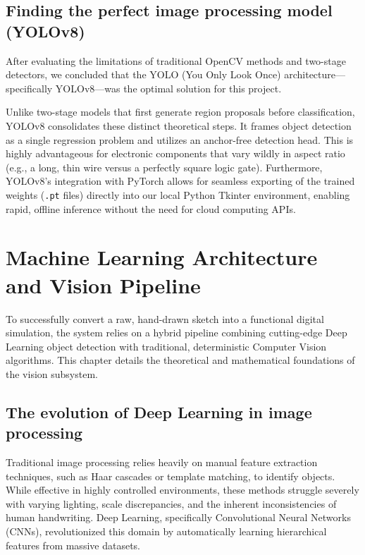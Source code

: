\documentclass[12pt]{article}
\begin{document}
\subsection{Finding the perfect image processing model (YOLOv8)}

After evaluating the limitations of traditional OpenCV methods and two-stage detectors, we concluded that the YOLO (You Only Look Once) architecture—specifically YOLOv8—was the optimal solution for this project. 

Unlike two-stage models that first generate region proposals before classification, YOLOv8 consolidates these distinct theoretical steps. It frames object detection as a single regression problem and utilizes an anchor-free detection head. This is highly advantageous for electronic components that vary wildly in aspect ratio (e.g., a long, thin wire versus a perfectly square logic gate). Furthermore, YOLOv8's integration with PyTorch allows for seamless exporting of the trained weights (\texttt{.pt} files) directly into our local Python Tkinter environment, enabling rapid, offline inference without the need for cloud computing APIs.



\section{Machine Learning Architecture and Vision Pipeline}

To successfully convert a raw, hand-drawn sketch into a functional digital simulation, the system relies on a hybrid pipeline combining cutting-edge Deep Learning object detection with traditional, deterministic Computer Vision algorithms. This chapter details the theoretical and mathematical foundations of the vision subsystem.

\subsection{The evolution of Deep Learning in image processing}

Traditional image processing relies heavily on manual feature extraction techniques, such as Haar cascades or template matching, to identify objects. While effective in highly controlled environments, these methods struggle severely with varying lighting, scale discrepancies, and the inherent inconsistencies of human handwriting. Deep Learning, specifically Convolutional Neural Networks (CNNs), revolutionized this domain by automatically learning hierarchical features from massive datasets.
\end{document}
